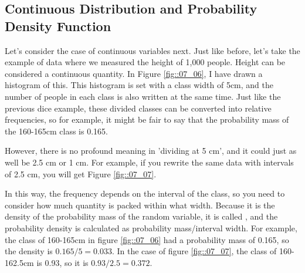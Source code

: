 \documentclass{ltjbook}
\begin{document}
\subsection{Continuous Distribution and Probability Density Function}
\label{continuousDistribution}
Let's consider the case of continuous variables next. Just like before, let's take the example of data where we measured the height of 1,000 people. Height can be considered a continuous quantity. In Figure \ref{fig::07_06}, I have drawn a histogram of this. This histogram is set with a class width of 5cm, and the number of people in each class is also written at the same time. Just like the previous dice example, these divided classes can be converted into relative frequencies, so for example, it might be fair to say that the probability mass of the 160-165cm class is 0.165.

However, there is no profound meaning in 'dividing at 5 cm', and it could just as well be 2.5 cm or 1 cm. For example, if you rewrite the same data with intervals of 2.5 cm, you will get Figure \ref{fig::07_07}.

In this way, the frequency depends on the interval of the class, so you need to consider how much quantity is packed within what width. Because it is the density of the probability mass of the random variable, it is called , and the probability density is calculated as probability mass/interval width. For example, the class of 160-165cm in figure \ref{fig::07_06} had a probability mass of 0.165, so the density is $0.165 / 5 = 0.033$. In the case of figure \ref{fig::07_07}, the class of 160-162.5cm is 0.93, so it is $0.93 / 2.5 = 0.372$.
\end{document}
